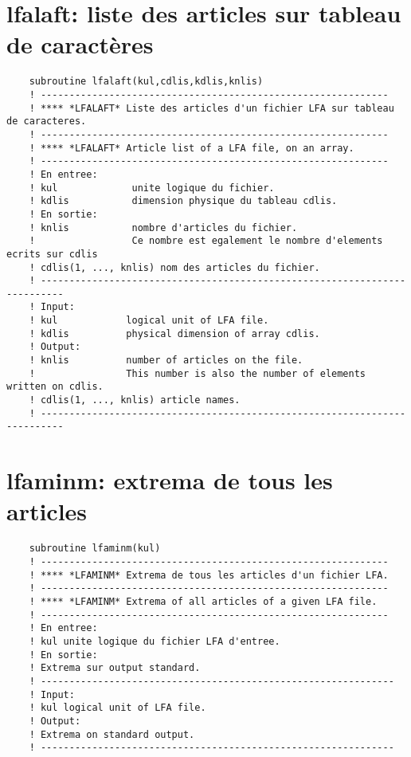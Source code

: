 \documentclass[10pt,french]{book}
\begin{document}
\section{lfalaft: liste des articles sur tableau de caractères}
 
 
 
\begin{verbatim}
	subroutine lfalaft(kul,cdlis,kdlis,knlis)
	! -------------------------------------------------------------                
	! **** *LFALAFT* Liste des articles d'un fichier LFA sur tableau de caracteres.
	! -------------------------------------------------------------                
	! **** *LFALAFT* Article list of a LFA file, on an array.
	! -------------------------------------------------------------                
	! En entree:
	! kul             unite logique du fichier.
	! kdlis           dimension physique du tableau cdlis.
	! En sortie:
	! knlis           nombre d'articles du fichier.
	!                 Ce nombre est egalement le nombre d'elements ecrits sur cdlis
	! cdlis(1, ..., knlis) nom des articles du fichier.
	! --------------------------------------------------------------------------
	! Input:
	! kul            logical unit of LFA file.
	! kdlis          physical dimension of array cdlis.
	! Output:
	! knlis          number of articles on the file.
	!                This number is also the number of elements written on cdlis.
	! cdlis(1, ..., knlis) article names.
	! --------------------------------------------------------------------------
\end{verbatim}
 
\section{lfaminm: extrema de tous les articles}
 
 
\begin{verbatim}
	subroutine lfaminm(kul)
	! -------------------------------------------------------------                
	! **** *LFAMINM* Extrema de tous les articles d'un fichier LFA.
	! -------------------------------------------------------------                
	! **** *LFAMINM* Extrema of all articles of a given LFA file.
	! -------------------------------------------------------------                
	! En entree:
	! kul unite logique du fichier LFA d'entree.
	! En sortie:
	! Extrema sur output standard.
	! --------------------------------------------------------------
	! Input:
	! kul logical unit of LFA file.
	! Output:
	! Extrema on standard output.
	! --------------------------------------------------------------
\end{verbatim}
\end{document}
